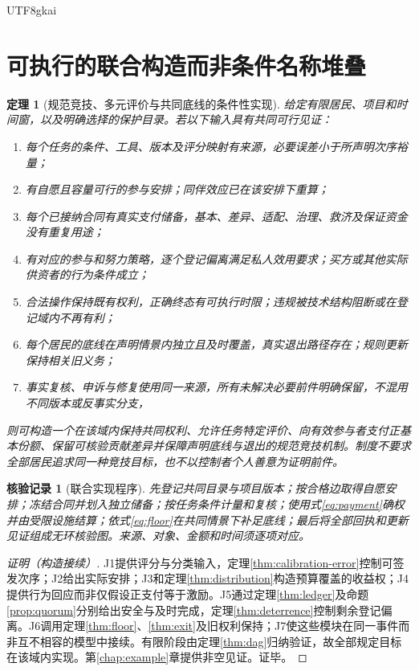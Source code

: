 \documentclass[12pt,a4paper,openany]{report}
\newtheorem{theorem}{定理}[chapter]
\newtheorem{Certificate}{核验记录}[chapter]
\begin{document}
\begin{CJK*}{UTF8}{gkai}
\section{可执行的联合构造而非条件名称堆叠}
\begin{theorem}[规范竞技、多元评价与共同底线的条件性实现]
\label{thm:main}
给定有限居民、项目和时间窗，以及明确选择的保护目录。若以下输入具有共同可行见证：
\begin{enumerate}[label=\textup{(J\arabic*)},leftmargin=4em]
\item 每个任务的条件、工具、版本及评分映射有来源，必要误差小于所声明次序裕量；
\item 有自愿且容量可行的参与安排；同伴效应已在该安排下重算；
\item 每个已接纳合同有真实支付储备，基本、差异、适配、治理、救济及保证资金没有重复用途；
\item 有对应的参与和努力策略，逐个登记偏离满足私人效用要求；买方或其他实际供资者的行为条件成立；
\item 合法操作保持既有权利，正确终态有可执行时限；违规被技术结构阻断或在登记域内不再有利；
\item 每个居民的底线在声明情景内独立且及时覆盖，真实退出路径存在；规则更新保持相关旧义务；
\item 事实复核、申诉与修复使用同一来源，所有未解决必要前件明确保留，不混用不同版本或反事实分支，
\end{enumerate}
则可构造一个在该域内保持共同权利、允许任务特定评价、向有效参与者支付正基本份额、保留可核验贡献差异并保障声明底线与退出的规范竞技机制。制度不要求全部居民追求同一种竞技目标，也不以控制者个人善意为证明前件。
\end{theorem}
\begin{Certificate}[联合实现程序]
先登记共同目录与项目版本；按合格边取得自愿安排；冻结合同并划入独立储备；按任务条件计量和复核；使用式\eqref{eq:payment}确权并由受限设施结算；依式\eqref{eq:floor}在共同情景下补足底线；最后将全部回执和更新见证组成无环核验图。来源、对象、金额和时间须逐项对应。
\end{Certificate}
\begin{proof}[证明（构造接续）]
J1提供评分与分类输入，定理\ref{thm:calibration-error}控制可签发次序；J2给出实际安排；J3和定理\ref{thm:distribution}构造预算覆盖的收益权；J4提供行为回应而非仅假设正支付等于激励。J5通过定理\ref{thm:ledger}及命题\ref{prop:quorum}分别给出安全与及时完成，定理\ref{thm:deterrence}控制剩余登记偏离。J6调用定理\ref{thm:floor}、\ref{thm:exit}及旧权利保持；J7使这些模块在同一事件而非互不相容的模型中接续。有限阶段由定理\ref{thm:dag}归纳验证，故全部规定目标在该域内实现。第\ref{chap:example}章提供非空见证。证毕。
\end{proof}


\end{CJK*}
\end{document}
